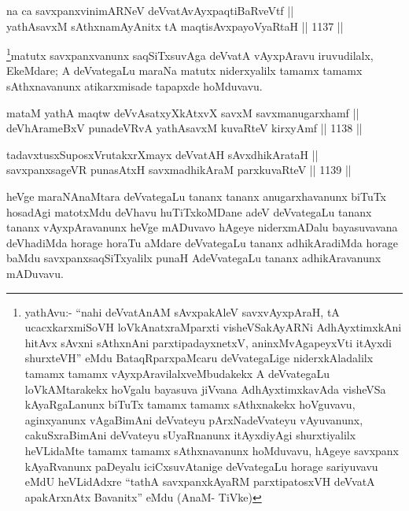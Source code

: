 \begin{shl}
na ca savxpanxvinimARNeV deVvatAvAyxpaqtiBaRveVtf || \\
yathAsavxM sAthxnamAyAnitx tA maqtisAvxpayoVyaRtaH ||  1137 || 
\end{shl}

\begin{artha}
\footnote{yathAvu:- ``nahi deVvatAnAM sAvxpakAleV savxvAyxpAraH, tA ucacxkarxmiSoVH loVkAnatxraMparxti visheVSakAyARNi AdhAyxtimxkAni hitAvx sAvxni sAthxnAni parxtipadayxnetxV, aninxMvAgapeyxVti itAyxdi shurxteVH'' eMdu BataqRparxpaMcaru deVvategaLige niderxkAladalilx tamamx tamamx vAyxpAravilalxveMbudakekx A deVvategaLu loVkAMtarakekx hoVgalu bayasuva jiVvana AdhAyxtimxkavAda visheVSa kAyaRgaLanunx biTuTx tamamx tamamx sAthxnakekx hoVguvavu, aginxyanunx vAgaBimAni deVvateyu pArxNadeVvateyu vAyuvanunx, cakuSxraBimAni deVvateyu sUyaRnanunx itAyxdiyAgi shurxtiyalilx heVLidaMte tamamx tamamx sAthxnavanunx hoMduvavu, hAgeye savxpanx kAyaRvanunx paDeyalu iciCxsuvAtanige deVvategaLu horage sariyuvavu eMdU heVLidAdxre ``tathA savxpanxkAyaRM parxtipatosxVH deVvatA apakArxnAtx Bavanitx'' eMdu (AnaM- TiVke)}matutx savxpanxvanunx saqSiTxsuvAga deVvatA vAyxpAravu iruvudilalx, EkeMdare; A deVvategaLu maraNa matutx niderxyalilx tamamx tamamx sAthxnavanunx atikarxmisade tapapxde hoMduvavu.
\end{artha}


\begin{shl}
mataM yathA maqtw deVvAsatxyXkAtxvX savxM savxmanugarxhamf || \\
deVhArameBxV punadeVRvA yathAsavxM kuvaRteV kirxyAmf ||  1138 ||  
\end{shl}
				
\begin{shl}
tadavxtusxSuposxVrutakxrXmayx deVvatAH sAvxdhikArataH ||  \\
savxpanxsageVR punasAtxH savxmadhikAraM parxkuvaRteV ||  1139 ||  
\end{shl}

\begin{artha}
heVge maraNAnaMtara deVvategaLu tananx tananx anugarxhavanunx biTuTx hosadAgi matotxMdu deVhavu huTiTxkoMDane adeV deVvategaLu tananx tananx vAyxpAravanunx heVge mADuvavo hAgeye niderxmADalu bayasuvavana deVhadiMda horage horaTu aMdare deVvategaLu tananx adhikAradiMda horage baMdu savxpanxsaqSiTxyalilx punaH AdeVvategaLu tananx adhikAravanunx mADuvavu.
\end{artha}

